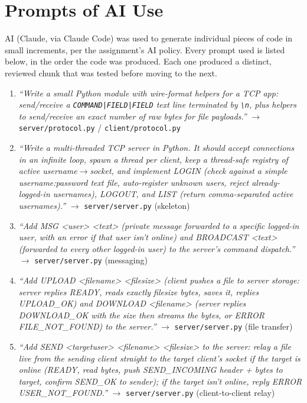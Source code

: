 \documentclass[11pt]{article}
\newcommand{\cmd}[1]{\texttt{#1}}
\begin{document}
\section{Prompts of AI Use}

AI (Claude, via Claude Code) was used to generate individual pieces of
code in small increments, per the assignment's AI policy. Every prompt
used is listed below, in the order the code was produced. Each one
produced a distinct, reviewed chunk that was tested before moving to the
next.

\begin{enumerate}[leftmargin=1.7em]

\item \textit{``Write a small Python module with wire-format helpers
for a TCP app: send/receive a \texttt{COMMAND|FIELD|FIELD} text line
terminated by \texttt{\textbackslash{}n}, plus helpers to send/receive
an exact number of raw bytes for file payloads.''} $\to$
\cmd{server/protocol.py} / \cmd{client/protocol.py}

\item \textit{``Write a multi-threaded TCP server in Python. It should
accept connections in an infinite loop, spawn a thread per client, keep
a thread-safe registry of active username$\to$socket, and implement
LOGIN (check against a simple username:password text file,
auto-register unknown users, reject already-logged-in usernames),
LOGOUT, and LIST (return comma-separated active usernames).''} $\to$
\cmd{server/server.py} (skeleton)

\item \textit{``Add MSG \textless{}user\textgreater{}
\textless{}text\textgreater{} (private message forwarded to a specific
logged-in user, with an error if that user isn't online) and BROADCAST
\textless{}text\textgreater{} (forwarded to every other logged-in user)
to the server's command dispatch.''} $\to$ \cmd{server/server.py}
(messaging)

\item \textit{``Add UPLOAD \textless{}filename\textgreater{}
\textless{}filesize\textgreater{} (client pushes a file to server
storage: server replies READY, reads exactly filesize bytes, saves it,
replies UPLOAD\_OK) and DOWNLOAD \textless{}filename\textgreater{}
(server replies DOWNLOAD\_OK with the size then streams the bytes, or
ERROR FILE\_NOT\_FOUND) to the server.''} $\to$ \cmd{server/server.py}
(file transfer)

\item \textit{``Add SEND \textless{}targetuser\textgreater{}
\textless{}filename\textgreater{} \textless{}filesize\textgreater{} to
the server: relay a file live from the sending client straight to the
target client's socket if the target is online (READY, read bytes,
push SEND\_INCOMING header + bytes to target, confirm SEND\_OK to
sender); if the target isn't online, reply ERROR USER\_NOT\_FOUND.''}
$\to$ \cmd{server/server.py} (client-to-client relay)


\end{enumerate}
\end{document}
